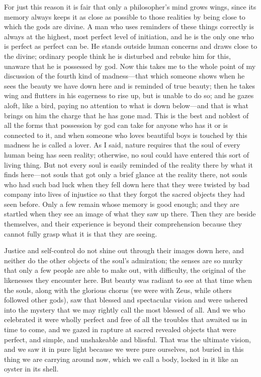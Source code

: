 For just this reason it is fair that only a philosopher’s mind grows
wings, since its memory always keeps it as close as possible to those
realities by being close to which the gods are divine. A man who uses
reminders of these things correctly is always at the highest, most
perfect level of initiation, and he is the only one who is perfect as
perfect can be. He stands outside human concerns and draws close to the
divine; ordinary people think he is disturbed and rebuke him for
this, unaware that he is possessed by god. Now this takes me to the
whole point of my discussion of the fourth kind of madness---that which
someone shows when he sees the beauty we have down here and is reminded
of true beauty; then he takes wing and flutters in his eagerness to rise
up, but is unable to do so; and he gazes aloft, like a bird, paying no
attention to what is down below---and that is what brings on him the
charge that he has gone mad. This is the best and noblest of all
the forms that possession by god can take for anyone who has it or is
connected to it, and when someone who loves beautiful boys is touched by
this madness he is called a lover. As I said, nature requires that the
soul of every human being has seen reality; otherwise, no soul could
have entered this sort of living thing. But not every 
soul is easily reminded of the reality there by what it finds here---not
souls that got only a brief glance at the reality there, not souls who
had such bad luck when they fell down here that they were twisted by bad
company into lives of injustice so that they forgot the sacred objects
they had seen before. Only a few remain whose memory is good enough; and
they are startled when they see an image of what they saw up there. Then
they are beside themselves, and their experience is beyond their
comprehension because they cannot fully grasp what it is that they are
seeing.

Justice and self-control do not shine out through their images down
here, and neither do the other objects of the soul’s admiration; the
senses are so murky that only a few people are able to make out, with
difficulty, the original of the likenesses they encounter here. But
beauty was radiant to see at that time when the souls, along with the
glorious chorus (we
were with Zeus, while others followed other gods), saw that blessed and
spectacular vision and were ushered into the mystery that we may rightly 
call the most blessed of all. And we who celebrated it were
wholly perfect and free of all the troubles that awaited us in time to
come, and we gazed in rapture at sacred revealed objects that were
perfect, and simple, and unshakeable and blissful. That was the ultimate
vision, and we saw it in pure light because we were pure ourselves, not
buried in this thing we are carrying around now, which we call a body,
locked in it like an oyster in its shell.

